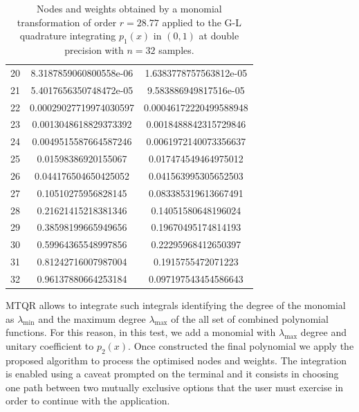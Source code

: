 \documentclass[a4paper, twosided]{book}
\begin{document}
\begin{table}[H]
\begin{tabular}{|c||c|c|}
20  &  8.3187859060800558e-06  &  1.6383778757563812e-05  \\
21  &  5.4017656350748472e-05  &  9.583886949817516e-05   \\
22  &  0.00029027719974030597  &  0.00046172220499588948  \\
23  &  0.0013048618829373392   &  0.0018488842315729846   \\
24  &  0.0049515587664587246   &  0.0061972140073356637   \\
25  &  0.01598386920155067     &  0.017474549464975012    \\
26  &  0.044176504650425052    &  0.041563995305652503    \\
27  &  0.10510275956828145     &  0.083385319613667491    \\
28  &  0.21621415218381346     &  0.14051580648196024     \\
29  &  0.38598199665949656     &  0.19670495174814193     \\
30  &  0.59964365548997856     &  0.22295968412650397     \\
31  &  0.81242716007987004     &  0.1915755472071223      \\
32  &  0.96137880664253184     &  0.097197543454586643    \\
\hline
\end{tabular}
  \caption{Nodes and weights obtained by a monomial transformation of order $r=28.77$ applied to the G-L quadrature integrating $p_1(x)$ in $(0,1)$ at double precision with $n=32$ samples.}
  \label{table2.2}
\end{table}

\noindent
MTQR allows to integrate such integrals identifying the degree of the monomial as $\lambda_{\text{min}}$ and the maximum degree  $\lambda_{\text{max}}$ of the all set of combined polynomial functions. For this reason, in this test, we add a monomial with $\lambda_{\text{max}}$ degree and unitary coefficient to $p_2(x)$. Once constructed the final polynomial we apply the proposed algorithm to process the optimised nodes and weights. The integration is enabled using a caveat prompted on the terminal and it consists in choosing one path between two mutually exclusive options that the user must exercise in order to continue with the application.
\end{document}

